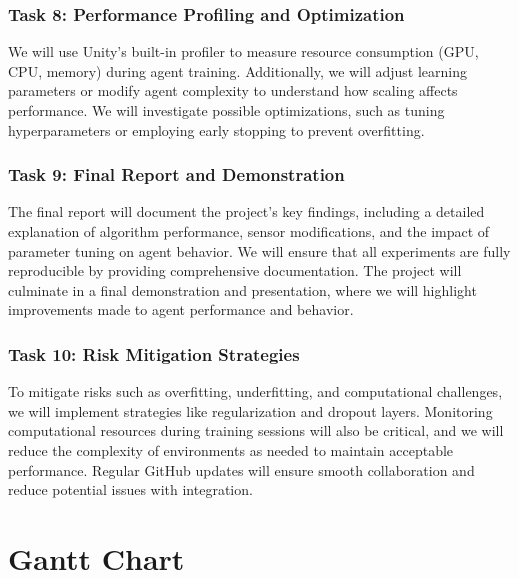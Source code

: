 \documentclass{article}
\begin{document}
\begin{flushleft}
\subsubsection{Task 8: Performance Profiling and Optimization}
\hspace{2em}We will use Unity’s built-in profiler to measure resource consumption (GPU, CPU, memory) during agent training. Additionally, we will adjust learning parameters or modify agent complexity to understand how scaling affects performance. We will investigate possible optimizations, such as tuning hyperparameters or employing early stopping to prevent overfitting.

\subsubsection{Task 9: Final Report and Demonstration}
\hspace{2em}The final report will document the project’s key findings, including a detailed explanation of algorithm performance, sensor modifications, and the impact of parameter tuning on agent behavior. We will ensure that all experiments are fully reproducible by providing comprehensive documentation. The project will culminate in a final demonstration and presentation, where we will highlight improvements made to agent performance and behavior.

\subsubsection{Task 10: Risk Mitigation Strategies}
\hspace{2em}To mitigate risks such as overfitting, underfitting, and computational challenges, we will implement strategies like regularization and dropout layers. Monitoring computational resources during training sessions will also be critical, and we will reduce the complexity of environments as needed to maintain acceptable performance. Regular GitHub updates will ensure smooth collaboration and reduce potential issues with integration.

\end{flushleft}

\section{Gantt Chart}


\end{document}
